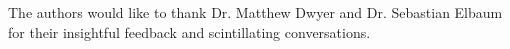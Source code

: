 \documentclass[prodmode,acmtecs]{acmsmall} %
\begin{document}











\begin{acks}
  The authors would like to thank Dr. Matthew Dwyer and Dr. Sebastian Elbaum for their insightful feedback and scintillating conversations.
\end{acks}




\end{document}
